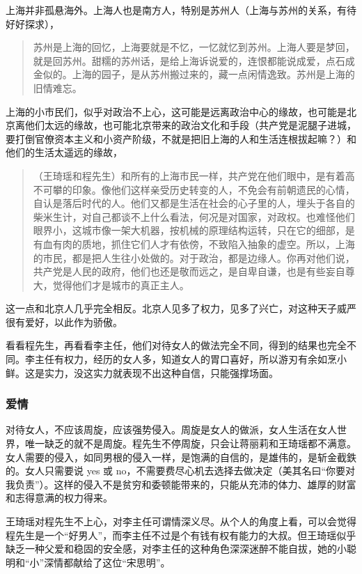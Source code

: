 上海并非孤悬海外。上海人也是南方人，特别是苏州人（上海与苏州的关系，有待好好探求），
\begin{quotation}
苏州是上海的回忆，上海要就是不忆，一忆就忆到苏州。上海人要是梦回，就是回苏州。甜糯的苏州话，是给上海诉说爱的，连恨都能说成爱，点石成金似的。上海的园子，是从苏州搬过来的，藏一点闲情逸致。苏州是上海的旧情难忘。
\end{quotation}
上海的小市民们，似乎对政治不上心，这可能是远离政治中心的缘故，也可能是北京离他们太远的缘故，也可能北京带来的政治文化和手段（共产党是泥腿子进城，要打倒官僚资本主义和小资产阶级，不就是把旧上海的人和生活连根拔起嘛？）和他们的生活太遥远的缘故，
\begin{quotation}
（王琦瑶和程先生）和所有的上海市民一样，共产党在他们眼中，是有着高不可攀的印象。像他们这样亲受历史转变的人，不免会有前朝遗民的心情，自认是落后时代的人。他们又都是生活在社会的心子里的人，埋头于各自的柴米生计，对自己都谈不上什么看法，何况是对国家，对政权。也难怪他们眼界小，这城市像一架大机器，按机械的原理结构运转，只在它的细部，是有血有肉的质地，抓住它们人才有依傍，不致陷入抽象的虚空。所以，上海的市民，都是把人生往小处做的。对于政治，都是边缘人。你再对他们说，共产党是人民的政府，他们也还是敬而远之，是自卑自谦，也是有些妄自尊大，觉得他们才是城市的真正主人。
\end{quotation}
这一点和北京人几乎完全相反。北京人见多了权力，见多了兴亡，对这种天子威严很有爱好，以此作为骄傲。

看看程先生，再看看李主任，他们对待女人的做法完全不同，得到的结果也完全不同。李主任有权力，经历的女人多，知道女人的胃口喜好，所以游刃有余如烹小鲜。这是实力，没这实力就表现不出这种自信，只能强撑场面。

\subsubsection{爱情}

对待女人，不应该周旋，应该强势侵入。周旋是女人的做派，女人生活在女人世界，唯一缺乏的就不是周旋。程先生不停周旋，只会让蒋丽莉和王琦瑶都不满意。女人需要的侵入，如同男根的侵入一样，是饱满的自信的，是雄伟的，是斩金截鉄的。女人只需要说 yes 或 no，不需要费尽心机去选择去做决定（美其名曰“你要对我负责”）。这样的侵入不是贫穷和委顿能带来的，只能从充沛的体力、雄厚的财富和志得意满的权力得来。

王琦瑶对程先生不上心，对李主任可谓情深义尽。从个人的角度上看，可以会觉得程先生是一个“好男人”，而李主任不过是个有钱有权有能力的大叔。但王琦瑶似乎缺乏一种父爱和稳固的安全感，对李主任的这种角色深深迷醉不能自拔，她的小聪明和“小”深情都献给了这位“宋思明”。

